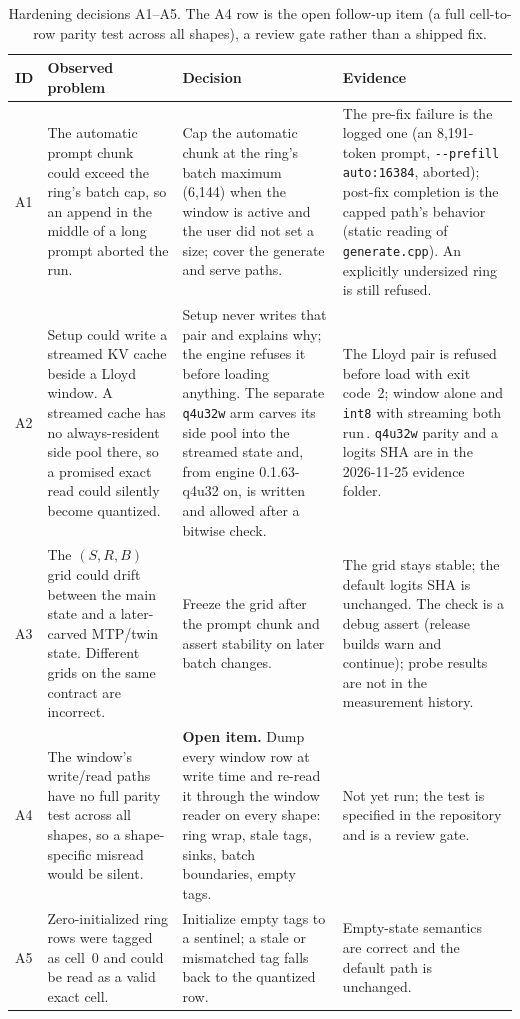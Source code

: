 \documentclass[10pt,twocolumn]{article}
\begin{document}
\begin{table}[t]
\centering
\small
\begin{tabularx}{\textwidth}{@{}l >{\raggedright\arraybackslash}X >{\raggedright\arraybackslash}X >{\raggedright\arraybackslash}X@{}}
\toprule
\textbf{ID} & \textbf{Observed problem} & \textbf{Decision} & \textbf{Evidence} \\
\midrule
A1 & The automatic prompt chunk could exceed the ring's batch cap, so an append in the middle of a long prompt aborted the run. & Cap the automatic chunk at the ring's batch maximum (6,144) when the window is active and the user did not set a size; cover the generate and serve paths. & The pre-fix failure is the logged one (an 8,191-token prompt, \texttt{-{}-prefill auto:16384}, aborted); post-fix completion is the capped path's behavior (static reading of \texttt{generate.cpp}). An explicitly undersized ring is still refused. \\
A2 & Setup could write a streamed KV cache beside a Lloyd window. A streamed cache has no always-resident side pool there, so a promised exact read could silently become quantized. & Setup never writes that pair and explains why; the engine refuses it before loading anything. The separate \texttt{q4u32w} arm carves its side pool into the streamed state and, from engine 0.1.63-q4u32 on, is written and allowed after a bitwise check. & The Lloyd pair is refused before load with exit code~2; window alone and \texttt{int8} with streaming both run\,\cite{strata-details}. \texttt{q4u32w} parity and a logits SHA are in the 2026-11-25 evidence folder. \\
A3 & The $(S,R,B)$ grid could drift between the main state and a later-carved MTP/twin state. Different grids on the same contract are incorrect. & Freeze the grid after the prompt chunk and assert stability on later batch changes. & The grid stays stable; the default logits SHA is unchanged. The check is a debug assert (release builds warn and continue); probe results are not in the measurement history. \\
A4 & The window's write/read paths have no full parity test across all shapes, so a shape-specific misread would be silent. & \textbf{Open item.} Dump every window row at write time and re-read it through the window reader on every shape: ring wrap, stale tags, sinks, batch boundaries, empty tags. & Not yet run; the test is specified in the repository and is a review gate. \\
A5 & Zero-initialized ring rows were tagged as cell~0 and could be read as a valid exact cell. & Initialize empty tags to a sentinel; a stale or mismatched tag falls back to the quantized row. & Empty-state semantics are correct and the default path is unchanged. \\
\bottomrule
\end{tabularx}
\caption{Hardening decisions A1--A5. The A4 row is the open follow-up item (a full cell-to-row parity test across all shapes), a review gate rather than a shipped fix.}
\label{tab:decisions}
\end{table}
\end{document}
